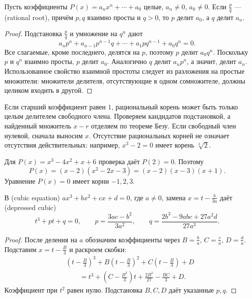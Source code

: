 \begin{theorem}
Пусть коэффициенты \(P(x)=a_nx^n+\cdots+a_0\) целые, \(a_n\neq0\), \(a_0\neq0\). Если \(\frac pq\) —  (rational root), причём \(p,q\) взаимно просты и \(q>0\), то \(p\) делит \(a_0\), а \(q\) делит \(a_n\).
\end{theorem}
\begin{proof}
Подстановка \(\frac pq\) и умножение на \(q^n\) дают
\[
a_np^n+a_{n-1}p^{n-1}q+\cdots+a_1pq^{n-1}+a_0q^n=0.
\]
Все слагаемые, кроме последнего, делятся на \(p\), поэтому \(p\) делит \(a_0q^n\). Поскольку \(p\) и \(q^n\) взаимно просты, \(p\) делит \(a_0\). Аналогично \(q\) делит \(a_np^n\), а значит, делит \(a_n\). Использованное свойство взаимной простоты следует из разложения на простые множители: множители делителя, отсутствующие в одном сомножителе, должны целиком входить в другой.
\end{proof}

Если старший коэффициент равен \(1\), рациональный корень может быть только целым делителем свободного члена. Проверяем кандидатов подстановкой, а найденный множитель \(x-r\) отделяем по теореме Безу. Если свободный член нулевой, сначала выносим \(x\). Отсутствие рациональных корней не означает отсутствия действительных: например, \(x^3-2=0\) имеет корень \(\sqrt[3]2\).

\begin{example}
Для \(P(x)=x^3-4x^2+x+6\) проверка даёт \(P(2)=0\). Поэтому
\[
P(x)=(x-2)(x^2-2x-3)=(x-2)(x-3)(x+1).
\]
Уравнение \(P(x)=0\) имеет корни \(-1,2,3\).
\end{example}

\begin{theorem}
В  (cubic equation)
\(ax^3+bx^2+cx+d=0\), где \(a\neq0\), замена \(x=t-\frac{b}{3a}\) даёт  (depressed cubic)
\[
t^3+pt+q=0,\qquad
p=\frac{3ac-b^2}{3a^2},\qquad
q=\frac{2b^3-9abc+27a^2d}{27a^3}.
\]
\end{theorem}
\begin{proof}
После деления на \(a\) обозначим коэффициенты через \(B=\frac ba\), \(C=\frac ca\), \(D=\frac da\). Подставим \(x=t-\frac B3\) и раскроем скобки:
\[
\begin{aligned}
&\left(t-\frac B3\right)^3+B\left(t-\frac B3\right)^2+C\left(t-\frac B3\right)+D\\
&\qquad=t^3+\left(C-\frac{B^2}{3}\right)t+\frac{2B^3}{27}-\frac{BC}{3}+D.
\end{aligned}
\]
Коэффициент при \(t^2\) равен нулю. Подстановка \(B,C,D\) даёт указанные \(p,q\).
\end{proof}

